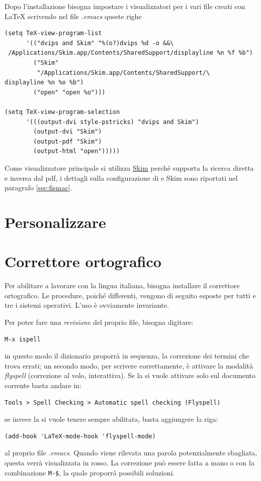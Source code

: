 \documentclass[10pt,a4paper]{article}
\begin{document}
Dopo l'installazione bisogna impostare i visualizzatori per i vari
file creati con \LaTeX{} scrivendo nel file \emph{.emacs} queste righe
\begin{verbatim}
(setq TeX-view-program-list
      '(("dvips and Skim" "%(o?)dvips %d -o &&\
 /Applications/Skim.app/Contents/SharedSupport/displayline %n %f %b")
        ("Skim"
         "/Applications/Skim.app/Contents/SharedSupport/\
displayline %n %o %b")
        ("open" "open %o")))

(setq TeX-view-program-selection 
      '(((output-dvi style-pstricks) "dvips and Skim")
        (output-dvi "Skim")
        (output-pdf "Skim")
        (output-html "open")))))
\end{verbatim}
Come visualizzatore principale si utilizza
\href{http://skim-app.sourceforge.net/}{Skim} perché supporta la
ricerca diretta e inversa dal pdf, i dettagli sulla configurazione di
\emacs e Skim sono riportati nel paragrafo \ref{sec:fismac}.

\section{Personalizzare \emacs{} }  %
\label{sec:personal}

\textcolor{red!50}{\lipsum[1]}

\section{Correttore ortografico}
\label{sec:corr}
Per abilitare \emacs{} a lavorare con la lingua italiana, bisogna
installare il correttore ortografico. Le procedure, poiché differenti,
vengono di seguito esposte per tutti e tre i sistemi operativi. 
L'uso è ovviamente invariante. 

Per poter fare una \emph{revisione} del proprio file, bisogna digitare:
\begin{Verbatim}
M-x ispell
\end{Verbatim}
in questo modo il dizionario proporrà in sequenza, la correzione
dei termini che trova errati; un secondo modo, per scrivere
correttamente, è attivare la modalità \emph{flyspell} (correzione al
volo, interattiva). Se la si vuole
attivare solo sul documento corrente basta andare in:
\begin{Verbatim}
Tools > Spell Checking > Automatic spell checking (Flyspell)
\end{Verbatim}
se invece la si vuole tenere sempre abilitata,
basta aggiungere la riga:
\begin{Verbatim}
(add-hook 'LaTeX-mode-hook 'flyspell-mode)
\end{Verbatim}
al proprio file \emph{.emacs}. Quando viene rilevata una parola
potenzialmente sbagliata, questa verrà visualizzata in rosso. La
correzione può essere fatta a mano o con la combinazione \verb!M-$!,
la quale proporrà possibili soluzioni.
\end{document}
